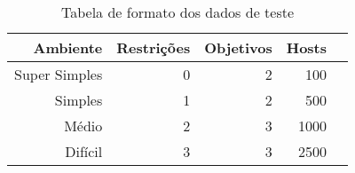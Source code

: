 \begin{table}[!htb]
    \centering
    \caption[Formato dos dados de teste]{Tabela de formato dos dados de teste
    \label{tab:testdata-info}}
    \begin{tabular}{rrrrr}
        \toprule
            Ambiente & Restrições & Objetivos & Hosts \\ 
        \midrule
            Super Simples & 0 & 2 & 100 & \\
            Simples & 1 & 2 & 500 \\
            Médio & 2 & 3 & 1000 \\
            Difícil & 3 & 3 & 2500 \\
        \bottomrule
    \end{tabular}
\end{table}
